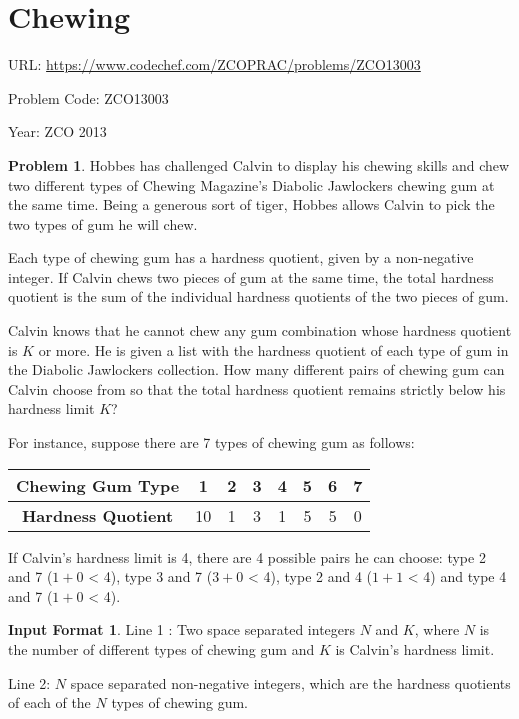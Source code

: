 \documentclass[twoside,12pt,a4paper,english]{book}
\theoremstyle{definition}
\theoremstyle{problemstyle}
\newtheorem*{problem}{Problem} %
\theoremstyle{problemstyle}
\newtheorem*{input_st}{Input Format} %
\theoremstyle{problemstyle}
\begin{document}
\newpage

\section{Chewing}

URL: \url{https://www.codechef.com/ZCOPRAC/problems/ZCO13003}

Problem Code: ZCO13003

Year: ZCO 2013

\begin{problem}

Hobbes has challenged Calvin to display his chewing skills and chew two different types of Chewing Magazine's Diabolic Jawlockers chewing gum at the same time. Being a generous sort of tiger, Hobbes allows Calvin to pick the two types of gum he will chew.


Each type of chewing gum has a hardness quotient, given by a non-negative integer. If Calvin chews two pieces of gum at the same time, the total hardness quotient is the sum of the individual hardness quotients of the two pieces of gum.


Calvin knows that he cannot chew any gum combination whose hardness quotient is $K$ or more. He is given a list with the hardness quotient of each type of gum in the Diabolic Jawlockers collection. How many different pairs of chewing gum can Calvin choose from so that the total hardness quotient remains strictly below his hardness limit $K$?

For instance, suppose there are 7 types of chewing gum as follows:

\begin{table}[!ht]
\begin{tabular}{|c|c|c|c|c|c|c|c|}
\hline
\textbf{Chewing Gum Type}  & 1  & 2 & 3 & 4 & 5 & 6 & 7 \\ \hline
\textbf{Hardness Quotient} & 10 & 1 & 3 & 1 & 5 & 5 & 0 \\ \hline
\end{tabular}
\end{table}


If Calvin's hardness limit is 4, there are 4 possible pairs he can choose: type 2 and 7 ($1+0$ < 4), type 3 and 7 ($3+0$ < 4), type 2 and 4 ($1+1$ < 4) and type 4 and 7 ($1+0$ < 4).
\end{problem}


\begin{input_st}

Line 1 : Two space separated integers $N$ and $K$, where $N$ is the number of different types of chewing gum and $K$ is Calvin's hardness limit.

Line 2: $N$ space separated non-negative integers, which are the hardness quotients of each of the $N$ types of chewing gum.

\end{input_st}
\end{document}
